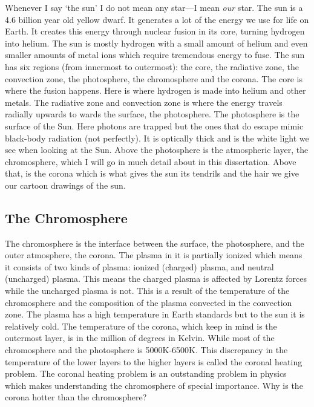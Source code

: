 \documentclass[12pt,upcase]{umlthesis}
\begin{document}
Whenever I say `the sun' I do not mean any star---I mean \textit{our} star. The sun is a 4.6 billion year old yellow dwarf. It generates a lot of the energy we use for life on Earth. It creates this energy through nuclear fusion in its core, turning hydrogen into helium. The sun is mostly hydrogen with a small amount of helium and even smaller amounts of metal ions which require tremendous energy to fuse. The sun has six regions (from innermost to outermost): the core, the radiative zone, the convection zone, the photosphere, the chromosphere and the corona. The core is where the fusion happens. Here is where hydrogen is made into helium and other metals. The radiative zone and convection zone is where the energy travels radially upwards to wards the surface, the photosphere. The photosphere is the surface of the Sun. Here photons are trapped but the ones that do escape mimic black-body radiation (not perfectly). It is optically thick and is the white light we see when looking at the Sun. Above the photosphere is the atmospheric layer, the chromosphere, which I will go in much detail about in this dissertation. Above that, is the corona which is what gives the sun its tendrils and the hair we give our cartoon drawings of the sun.

\subsection{The Chromosphere}

The chromosphere is the interface between the surface, the photosphere, and the outer atmosphere, the corona. The plasma in it is partially ionized which means it consists of two kinds of plasma: ionized (charged) plasma, and neutral (uncharged) plasma. This means the charged plasma is affected by Lorentz forces while the uncharged plasma is not. This is a result of the temperature of the chromosphere and the composition of the plasma convected in the convection zone. The plasma has a high temperature in Earth standards but to the sun it is relatively cold. The temperature of the corona, which keep in mind is the outermost layer, is in the million of degrees in Kelvin. While most of the chromosphere and the photosphere is 5000K-6500K. This discrepancy in the temperature of the lower layers to the higher layers is called the coronal heating problem. The coronal heating problem is an outstanding problem in physics which makes understanding the chromosphere of special importance. Why is the corona hotter than the chromosphere?
\end{document}

